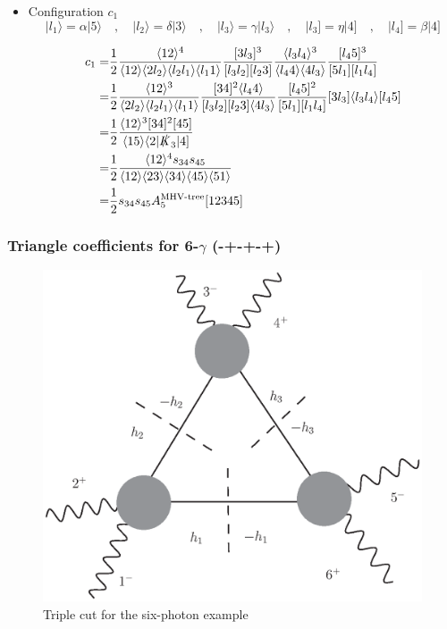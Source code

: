 \documentclass[english]{beamer}
\begin{document}
\begin{frame}[shrink=10]
\frametitle{}
\begin{itemize}
\item  Configuration $c_1$
\small
\begin{equation*}
|l_1\rangle = \alpha |5\rangle \quad,\quad
|l_2\rangle = \delta |3\rangle \quad,\quad
|l_3\rangle = \gamma |l_3\rangle\quad,\quad
|l_3] = \eta|4]\quad,\quad
|l_4] = \beta |4]
\end{equation*}

\begin{equation*}
\begin{split}
c_1 = &
\frac{1}{2}\frac{\langle 12 \rangle^4}{\langle 1 2 \rangle \langle 2 l_2\rangle \langle l_2 l_1 \rangle\langle l_1 1 \rangle}
\frac{[3l_3]^3}{[l_3 l_2][l_2 3]}
\frac{\langle l_3 l_4 \rangle^{3}}{\langle l_4 4 \rangle \langle 4 l_3\rangle}
\frac{[l_4 5 ]^3}{[5l_1][l_1 l_4]}
\\
= & 
\frac{1}{2}\frac{\langle 12 \rangle^3}{\langle 2 l_2 \rangle\langle l_2 l_1 \rangle\langle l_1 1\rangle}
\frac{[34]^2\langle l_4 4\rangle}{[l_3 l_2][l_2 3]\langle 4 l_3\rangle}
\frac{[l_4 5]^2}{[5l_1 ][l_1 l_4]}
[3 l_3]\langle l_3 l_4 \rangle [l_4 5]
\\
= &
\frac{1}{2}
\frac{\langle 12 \rangle^3[34]^2[45]}{\langle 15 \rangle\langle2|\slashed{K}_{3}|4]}
\\
= &
\frac{1}{2}\frac{\langle 12 \rangle^4 s_{34}s_{45}}{\langle 12 \rangle\langle 23 \rangle \langle 34\rangle \langle 45\rangle \langle 51\rangle}
\\
= &
\frac{1}{2}s_{34}s_{45}A_5^{\textrm{MHV-tree}}[12345]
\end{split}
\end{equation*}

\end{itemize}

\end{frame}
\begin{frame}
\frametitle{Triangle coefficients for 6-$\gamma$ (-+-+-+)}
\begin{figure}
  \centering
  \includegraphics[width=0.5\linewidth]{6photons.eps}
  \caption{Triple cut for the six-photon example}
  \label{fig-6photons}
\end{figure}

\end{frame}
\end{document}
